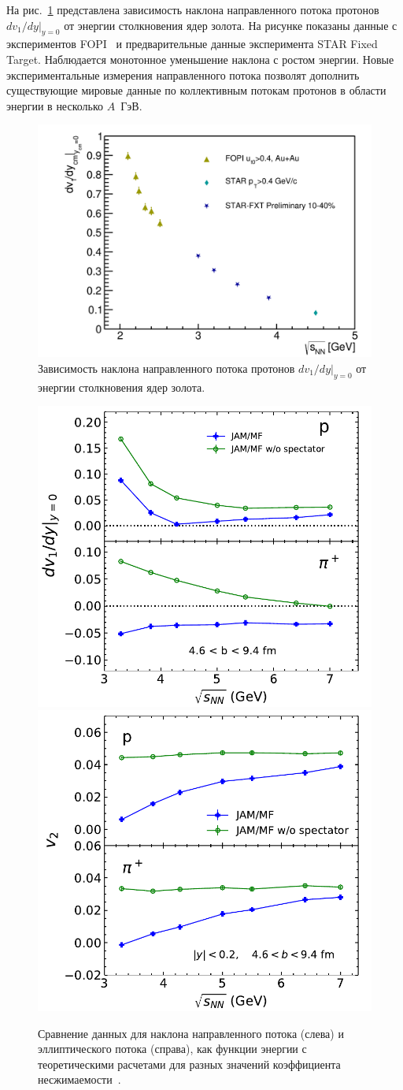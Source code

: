 На рис.~\ref{fig:dv1dy_energy} представлена зависимость наклона направленного потока протонов $dv_1/dy|_{y=0}$ от энергии столкновения ядер золота.
На рисунке показаны данные с экспериментов FOPI~\cite{FOPI:2011aa} и предварительные данные эксперимента STAR Fixed Target.
Наблюдается монотонное уменьшение наклона с ростом энергии.
Новые экспериментальные измерения направленного потока позволят дополнить существующие мировые данные по коллективным потокам протонов в области энергии в несколько $A$~ГэВ.
%
\begin{figure}
    \centering
    \includegraphics[width=0.5\linewidth]{images/dv1dy_sqrt_snn.png}
    \caption{Зависимость наклона направленного потока протонов $dv_1/dy|_{y=0}$ от энергии столкновения ядер золота.}
    \label{fig:dv1dy_energy}
\end{figure}


\begin{figure}[h]
    \centering
    \includegraphics[width=0.45\linewidth]{images/v1slopeMF2.pdf}
    \includegraphics[width=0.45\linewidth]{images/v2e37MF2.pdf}
    \caption{Сравнение данных для наклона направленного потока (слева) и эллиптического потока (справа), как функции энергии с теоретическими расчетами для разных значений коэффициента несжимаемости~\cite{Danielewicz:2002pu}.}
    \label{fig:v1slopeMF2}
\end{figure}



